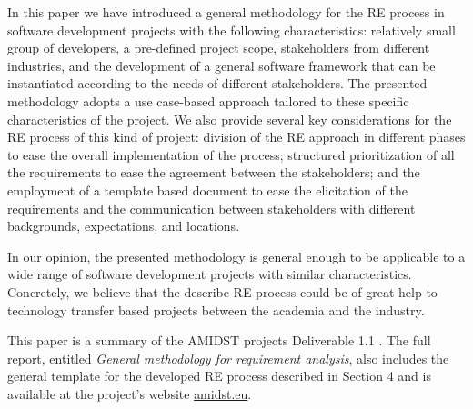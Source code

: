 In this paper we have introduced a general methodology for the 
RE process in software development projects
with the following characteristics: relatively small group of
developers, a pre-defined project scope, stakeholders from
different industries, and the development of a general software
framework that can be instantiated according to the needs of different 
stakeholders.  The presented methodology adopts a use case-based
approach tailored to these specific characteristics of the project.
We also provide several key considerations for the RE process of this kind of project: division of the RE
approach in different phases to ease the overall implementation of
the process; structured prioritization of all the requirements to
ease the agreement between the stakeholders; and the employment of
a template based document to ease the elicitation of the
requirements and the communication between stakeholders with
different backgrounds, expectations, and locations.

In our opinion, the presented methodology is general enough to be 
applicable to a wide range of software development projects with 
similar characteristics. Concretely, we believe that the describe
RE process could be of great help to technology transfer based
projects between the academia and the industry.

This paper is a summary of the AMIDST projects Deliverable 1.1 \cite{Fer14}. The full report, entitled \emph{General methodology for
  requirement analysis}, also includes the general template for the developed RE process described in Section 4
and is available at the project's website \url{amidst.eu}.